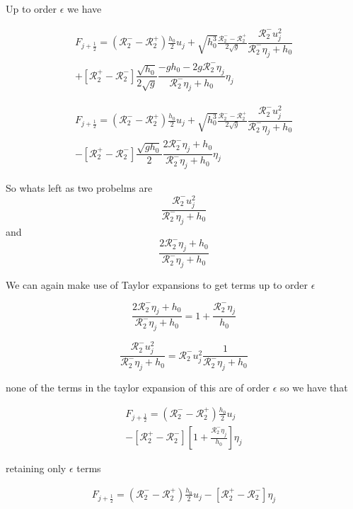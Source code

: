 \documentclass[12pt]{article}
\begin{document}
Up to order $\epsilon$ we have

\begin{multline}
F_{j+\frac{1}{2}} = \left( \mathcal{R}_2^-  - \mathcal{R}_2^+ \right) \frac{h_0}{2}u_j + \sqrt{h_0^3}\frac{\mathcal{R}_2^-  - \mathcal{R}_2^+}{2 \sqrt{g}} \dfrac{\mathcal{R}_2^- u_{j}^2}{\mathcal{R}_2^-\eta_{j}  + h_0}  \\
+ \left [ \mathcal{R}_2^+ - \mathcal{R}_2^-\right ] \dfrac{\sqrt{h_0}}{2\sqrt{g}} \dfrac{ - gh_0 - 2 g \mathcal{R}_2^- \eta_{j} }{ \mathcal{R}_2^-\eta_{j}  + h_0 }  \eta_j
\end{multline}

\begin{multline}
F_{j+\frac{1}{2}} = \left( \mathcal{R}_2^-  - \mathcal{R}_2^+ \right) \frac{h_0}{2}u_j + \sqrt{h_0^3}\frac{\mathcal{R}_2^-  - \mathcal{R}_2^+}{2 \sqrt{g}} \dfrac{\mathcal{R}_2^- u_{j}^2}{\mathcal{R}_2^-\eta_{j}  + h_0}  \\
- \left [ \mathcal{R}_2^+ - \mathcal{R}_2^-\right ] \dfrac{\sqrt{gh_0}}{2} \dfrac{2\mathcal{R}_2^- \eta_{j} + h_0 }{ \mathcal{R}_2^-\eta_{j}  + h_0 }  \eta_j
\end{multline}

So whats left as two probelms are 
\[\dfrac{\mathcal{R}_2^- u_{j}^2}{\mathcal{R}_2^-\eta_{j}  + h_0}\]
and
\[\dfrac{2\mathcal{R}_2^- \eta_{j} + h_0 }{ \mathcal{R}_2^-\eta_{j}  + h_0 }\]

We can again make use of Taylor expansions to get terms up to order $\epsilon$

\[\dfrac{2\mathcal{R}_2^- \eta_{j} + h_0 }{ \mathcal{R}_2^-\eta_{j}  + h_0 } = 1 + \frac{\mathcal{R}_2^- \eta_{j}}{h_0}\]

\[\dfrac{\mathcal{R}_2^- u_{j}^2}{\mathcal{R}_2^-\eta_{j}  + h_0} = \mathcal{R}_2^- u_{j}^2\dfrac{1}{\mathcal{R}_2^-\eta_{j}  + h_0}\]

none of the terms in the taylor expansion of this are of order $\epsilon$ so we have that

\begin{multline}
F_{j+\frac{1}{2}} = \left( \mathcal{R}_2^-  - \mathcal{R}_2^+ \right) \frac{h_0}{2}u_j  \\
- \left [ \mathcal{R}_2^+ - \mathcal{R}_2^-\right ]\left[1 + \frac{\mathcal{R}_2^- \eta_{j}}{h_0}\right] \eta_j
\end{multline}

retaining only $\epsilon$ terms

\begin{gather}
F_{j+\frac{1}{2}} = \left( \mathcal{R}_2^-  - \mathcal{R}_2^+ \right) \frac{h_0}{2}u_j 
- \left [ \mathcal{R}_2^+ - \mathcal{R}_2^-\right ] \eta_j
\end{gather}
\end{document}
